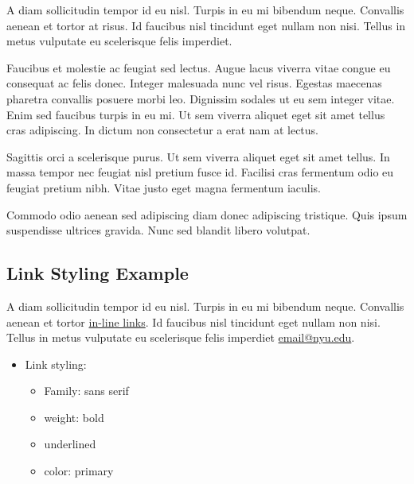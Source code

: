 \documentclass{nyu22report}
\begin{document}
A diam sollicitudin tempor id eu nisl. Turpis in eu mi bibendum neque. Convallis
aenean et tortor at risus. Id faucibus nisl tincidunt eget nullam non nisi.
Tellus in metus vulputate eu scelerisque felis imperdiet.

Faucibus et molestie ac feugiat sed lectus. Augue lacus viverra vitae congue eu
consequat ac felis donec. Integer malesuada nunc vel risus. Egestas maecenas
pharetra convallis posuere morbi leo. Dignissim sodales ut eu sem integer vitae.
Enim sed faucibus turpis in eu mi. Ut sem viverra aliquet eget sit amet tellus
cras adipiscing. In dictum non consectetur a erat nam at lectus.

Sagittis orci a scelerisque purus. Ut sem viverra aliquet eget sit amet tellus.
In massa tempor nec feugiat nisl pretium fusce id. Facilisi cras fermentum odio
eu feugiat pretium nibh. Vitae justo eget magna fermentum iaculis.

Commodo odio aenean sed adipiscing diam donec adipiscing tristique. Quis ipsum
suspendisse ultrices gravida. Nunc sed blandit libero volutpat.

\subsection{Link Styling Example}

A diam sollicitudin tempor id eu nisl. Turpis in eu mi bibendum neque. Convallis
aenean et tortor \href{https://www.nyu.edu/}{in-line links}. Id faucibus nisl
tincidunt eget nullam non nisi. Tellus in metus vulputate eu scelerisque felis
imperdiet \href{mailto:email@nyu.edu}{email@nyu.edu}. 

\begin{itemize}
    \item Link styling:
    \begin{itemize}
        \item Family: sans serif
        \item weight: bold
        \item underlined
        \item color: primary
    \end{itemize}
\end{itemize}
\end{document}

